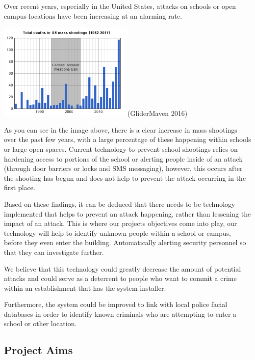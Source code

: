 \documentclass[
  english,
  a4paper,
,tablecaptionabove
]{scrartcl}
\begin{document}
Over recent years, especially in the United States, attacks on schools
or open campus locations have been increasing at an alarming rate.

\includegraphics[width=0.5\textwidth,height=\textheight]{images/ppm-images/shootings.png}(GliderMaven
2016)

As you can see in the image above, there is a clear increase in mass
shootings over the past few years, with a large percentage of these
happening within schools or large open spaces. Current technology to
prevent school shootings relies on hardening access to portions of the
school or alerting people inside of an attack (through door barriers or
locks and SMS messaging), however, this occurs after the shooting has
begun and does not help to prevent the attack occurring in the first
place.

Based on these findings, it can be deduced that there needs to be
technology implemented that helps to prevent an attack happening, rather
than lessening the impact of an attack. This is where our projects
objectives come into play, our technology will help to identify unknown
people within a school or campus, before they even enter the building.
Automatically alerting security personnel so that they can investigate
further.

We believe that this technology could greatly decrease the amount of
potential attacks and could serve as a deterrent to people who want to
commit a crime within an establishment that has the system installer.

Furthermore, the system could be improved to link with local police
facial databases in order to identify known criminals who are attempting
to enter a school or other location.

\newpage

\hypertarget{project-aims}{%
\subsection{Project Aims}\label{project-aims}}
\end{document}
